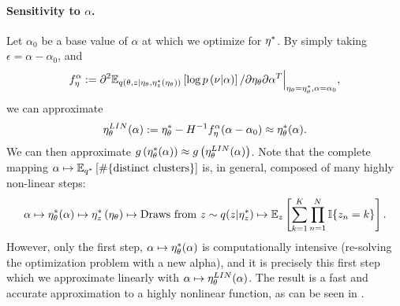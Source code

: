 \paragraph{Sensitivity to $\alpha$.}
%
Let $\alpha_0$ be a base value of $\alpha$ at which we optimize for
$\eta^{*}$. By simply taking $\epsilon = \alpha - \alpha_0$, and
%
\begin{align*}
f^\alpha_\eta := \partial^2
    \mathbb{E}_{q\left(\theta, z \vert \eta_\theta, \eta_z^{*}(\eta_\theta)\right)}
        \left[ \log p\left(\nu \vert \alpha \right) \right]
    / \partial \eta_\theta \partial \alpha^T
    \Big\rvert_{\eta_\theta = \eta_\theta^{*}, \alpha = \alpha_0},
\end{align*}
%
we can approximate
%
\begin{align*}
\eta_\theta^{LIN}(\alpha) := \eta_\theta^{*} -
  H^{-1} f^\alpha_\eta (\alpha - \alpha_0) \approx \eta_\theta^{*}(\alpha).
\end{align*}
%
We can then approximate
$g\left(\eta_\theta^{*}(\alpha)\right) \approx g\left(\eta_\theta^{LIN}(\alpha)\right)$.
Note that the complete mapping
$\alpha \mapsto \mathbb{E}_{q^{*}} \left[ \#\{\text{distinct clusters}\} \right]$
is, in general, composed of many highly non-linear steps:
%
\begin{align}
\alpha \mapsto
\eta_\theta^{*}(\alpha) \mapsto
\eta_z^{*}\left(\eta_\theta\right) \mapsto
\textrm{Draws from }z \sim q(z \vert \eta_z^{*}) \mapsto
\mathbb{E}_z\left[\sum_{k=1}^K \prod_{n=1}^N \mathbb{I}\{z_n = k\}\right].
\end{align}
%
However, only the first step, $\alpha \mapsto \eta_\theta^{*}(\alpha)$ is
computationally intensive (re-solving the optimization problem
 with a new alpha), and it is precisely this
first step which we approximate linearly with $\alpha \mapsto
\eta_\theta^{LIN}(\alpha)$.  The result is a fast and accurate approximation to
a highly nonlinear function, as can be seen in .
